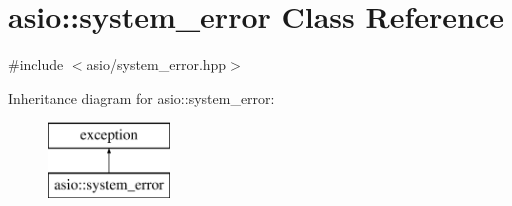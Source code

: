 \hypertarget{classasio_1_1system__error}{}\section{asio\+:\+:system\+\_\+error Class Reference}
\label{classasio_1_1system__error}


{\ttfamily \#include $<$asio/system\+\_\+error.\+hpp$>$}

Inheritance diagram for asio\+:\+:system\+\_\+error\+:\begin{figure}[H]
\begin{center}
\leavevmode
\includegraphics[height=2.000000cm]{classasio_1_1system__error}
\end{center}
\end{figure}

